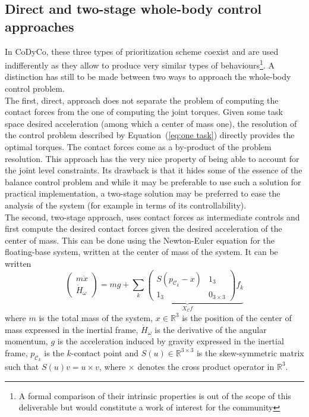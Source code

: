 \documentclass[12pt,a4paper,twoside]{article}
\begin{document}
\subsection{Direct and two-stage whole-body control approaches}

In CoDyCo, these three types of prioritization scheme coexist and are used indifferently as they allow to produce very similar types of behaviours\footnote{A formal comparison of their intrinsic properties is out of the scope of this deliverable but would constitute a work of interest for the community}. A distinction has still to be made between two ways to approach the whole-body control problem.\\

The first, direct, approach does not separate the problem of computing the contact forces from the one of computing the joint torques. Given some task space desired acceleration (among which a center of mass one), the resolution of the control problem described by Equation~(\ref{eq:one task}) directly provides the optimal torques. The contact forces come as a by-product of the problem resolution. This approach has the very nice property of being able to account for the joint level constraints. Its drawback is that it hides some of the essence of the balance control problem and while it may be preferable to use such a solution for practical implementation, a two-stage solution may be preferred to ease the analysis of the system (for example in terms of its controllability).\\

The second, two-stage approach, uses contact forces as intermediate controls and first compute the desired contact forces given the desired acceleration of the center of mass. This can be done using the Newton-Euler equation for the floating-base system, written at the center of mass of the system. It can be written
\begin{equation}
\label{equ:NE equation}
\left( \begin{array}{c}
m \ddot{x}\\ 
\dot{H}_{\omega}
\end{array}\right) =
m g + \underbrace{\sum_k \left(\begin{array}{cc}
S(p_{\mathcal{C}_k} - x) & 1_{3} \\
1_{3} & 0_{3\times 3}
\end{array}\right)  f_k}_{X_{\mathcal{C}} f}
\end{equation}
where $m$ is the total mass of the system, $x \in \mathbb{R}^3$ is the position of the center of mass expressed in the inertial frame, $\dot{H}_{\omega}$ is the derivative of the angular momentum, $g$ is the acceleration induced by gravity expressed in the inertial frame, $p_{\mathcal{C}_k}$ is the $k$-contact point and $S(u) \in \mathbb{R}^{3\times 3}$ is the skew-symmetric matrix such that $S(u)v = u \times v$, where $\times$ denotes the cross product operator in $\mathbb{R}^3$.\\
\end{document}
